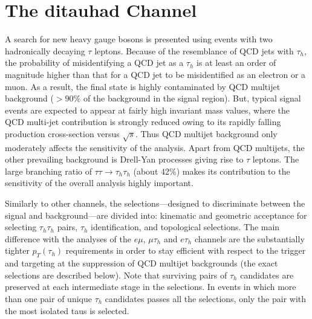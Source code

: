 \section{The ditauhad Channel}\label{sec:dihad}

A search for new heavy gauge bosons is presented using events with two hadronically decaying $\tau$ leptons. Because of the resemblance of QCD jets with $\tau_{h}$, the probability of misidentifying a QCD jet as a $\tau_{h}$ is at least an order of magnitude higher than that for a QCD jet to be misidentified as an electron or a muon. As a result, the final state is highly contaminated by QCD multijet background ($> 90\%$ of the background in the signal region). But, typical signal events are expected to appear at fairly high invariant mass values, where the QCD multi-jet contribution is strongly reduced owing to its rapidly falling production cross-section versus $\sqrt{s}$. Thus QCD multijet background only moderately affects the sensitivity of the analysis. Apart from QCD multijets, the other prevailing background is Drell-Yan processes giving rise to $\tau$ leptons. The large branching ratio of $\tau\tau \to \tau_{h}\tau_{h}$ (about 42\%) makes its contribution to the sensitivity of the overall analysis highly important. 


Similarly to other channels, the selections---designed to discriminate between the signal and background---are divided into: kinematic and geometric acceptance for selecting $\tau_{h}\tau_{h}$ pairs, $\tau_{h}$ identification, and topological selections. The main difference with the analyses of the $e\mu$, $\mu \tau_h$ and $e \tau_h$ channels are the substantially tighter $p_{T}(\tau_{h})$ requirements in order to stay efficient with respect to the trigger and targeting at the suppression of QCD multijet backgrounds (the exact selections are described below). Note that surviving pairs of $\tau_{h}$ candidates are preserved at each intermediate stage in the selections. In events in which more than one pair of unique $\tau_{h}$ candidates passes all the selections, only the pair with the most isolated taus is selected.


